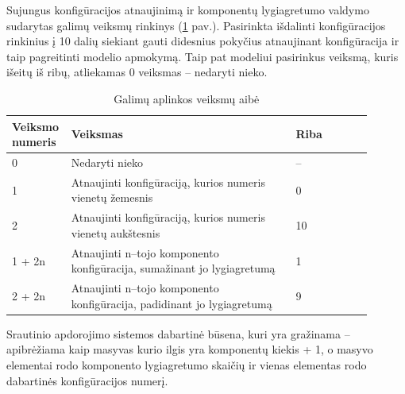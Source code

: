 \documentclass{VUMIFPSbakalaurinis}
\begin{document}
Sujungus konfigūracijos atnaujinimą ir komponentų lygiagretumo valdymo sudarytas galimų veiksmų rinkinys (\ref{action–space} pav.).
Pasirinkta išdalinti konfigūracijos rinkinius į 10 dalių siekiant gauti didesnius pokyčius atnaujinant konfigūracija ir taip pagreitinti modelio apmokymą. Taip pat modeliui pasirinkus veiksmą, kuris išeitų iš ribų, atliekamas 0 veiksmas – nedaryti nieko.

\begin{longtable}{|p{0.1\linewidth}|p{0.6\linewidth}|p{0.1\linewidth}|p{0.1\linewidth}|}
    \caption{Galimų aplinkos veiksmų aibė}
    \label{action–space}\\
    \hline
    \rowcolor[HTML]{C0C0C0} 
    Veiksmo numeris                 & Veiksmas & Riba      \\ \hline
    \endfirsthead
    \endhead
    0                               & Nedaryti nieko & –  \\ \hline
    1                               & Atnaujinti konfigūraciją, kurios numeris vienetų žemesnis & 0  \\ \hline
    2                               & Atnaujinti konfigūraciją, kurios numeris vienetų aukštesnis & 10 \\ \hline
    1 + 2n                          & Atnaujinti n–tojo komponento konfigūracija, sumažinant jo lygiagretumą & 1 \\ \hline
    2 + 2n                          & Atnaujinti n–tojo komponento konfigūracija, padidinant jo lygiagretumą & 9 \\ \hline
\end{longtable}

Srautinio apdorojimo sistemos dabartinė būsena, kuri yra gražinama – apibrėžiama kaip masyvas kurio ilgis yra komponentų kiekis + 1, o masyvo elementai rodo komponento lygiagretumo skaičių ir vienas elementas rodo dabartinės konfigūracijos numerį.
\end{document}
